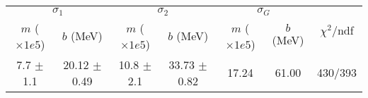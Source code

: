 \begin{tabular}{cc|cc|cc||c}
\multicolumn{2}{c|}{$\sigma_1$} & \multicolumn{2}{|c}{$\sigma_2$} & \multicolumn{2}{|c}{$\sigma_G$}  & \multirow{2}{*}{$\chi^2/$ndf}\\
$m$ ($\times1e5$) & $b$ (MeV) & $m$ ($\times1e5$) & $b$ (MeV) & $m$ ($\times1e5$) & $b$ (MeV) & \\
\hline
7.7 $\pm$ 1.1 & 20.12 $\pm$ 0.49 & 10.8 $\pm$ 2.1 & 33.73 $\pm$ 0.82 & 17.24 & 61.00 & 430/393\\
\end{tabular}
